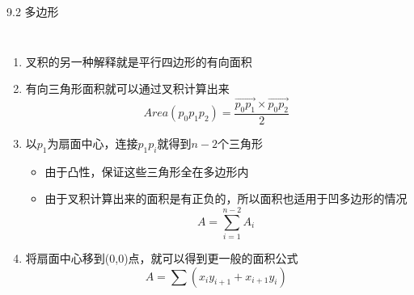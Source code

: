 \begin{frame}{9.2 多边形}
    \begin{columns}   
    \scriptsize{
    \begin{enumerate}[(1)]
        \item 叉积的另一种解释就是平行四边形的有向面积
        \item 有向三角形面积就可以通过叉积计算出来
        $$Area(p_0p_1p_2)=\frac{\overrightarrow{p_0p_1}\times \overrightarrow{p_0p_2}}{2}$$
        \item 以$p_1$为扇面中心，连接$p_1p_i$就得到$n-2$个三角形
        \begin{itemize}
            \item 由于凸性，保证这些三角形全在多边形内
            \item 由于叉积计算出来的面积是有正负的，所以面积也适用于凹多边形的情况
            $$A=\sum\limits_{i = 1}^{n-2}{A_i}$$
        \end{itemize}
        \item 将扇面中心移到(0,0)点，就可以得到更一般的面积公式
            $$A=\sum(x_iy_{i+1}+x_{i+1}y_i)$$
    \end{enumerate}}

\end{columns}
\end{frame}
